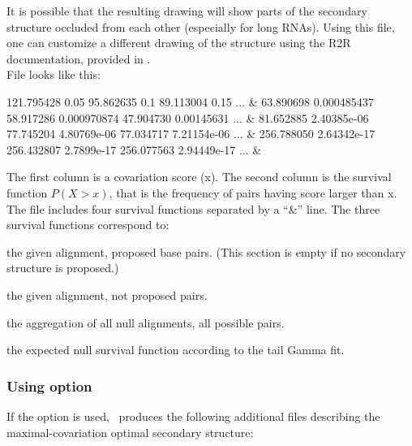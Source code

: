  It is possible that the resulting drawing will show parts of the
 secondary structure occluded from each other (especially for long
 RNAs).  Using this file, one can customize a different drawing of the
 structure using the R2R documentation, provided in
 .\\

 File  looks like this:

 \begin{sreoutput}
121.795428      0.05
95.862635       0.1
89.113004       0.15
...
 &
63.890698       0.000485437
58.917286       0.000970874
47.904730       0.00145631
...
 &
81.652885       2.40385e-06
77.745204       4.80769e-06
77.034717       7.21154e-06
...
 &
256.788050      2.64342e-17
256.432807      2.7899e-17
256.077563      2.94449e-17
...
 &
 \end{sreoutput}
 The first column is a covariation score (x). The second column is the
 survival function $P(X > x)$, that is the frequency of pairs having
 score larger than x. The file includes four survival functions separated by a
 ``\&'' line. The three survival functions correspond to:

 \begin{sreitems}{}
 \item[\prog{First functions:}] the given alignment, proposed base pairs.
 (This section is empty if no secondary structure is proposed.)
 \item[\prog{Second functions:}] the given alignment, not proposed pairs.
 \item[\prog{Third function:}] the aggregation of all null alignments, all possible pairs.
 \item[\prog{Fourth function:}] the expected null survival function according to the tail Gamma fit.
 \end{sreitems}

\subsubsection{Using option }
If the option  is used, \rscape\, produces the
following additional files describing the maximal-covariation optimal
secondary structure:

